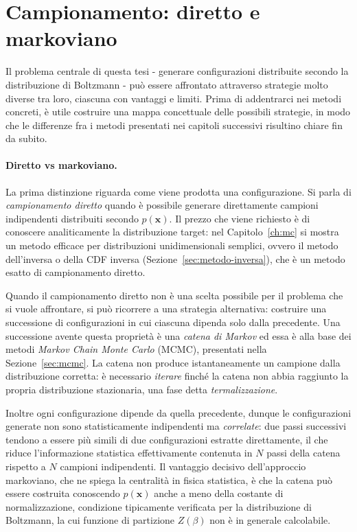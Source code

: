 \section{Campionamento: diretto e markoviano}
\label{sec:tassonomia_campionamento}

Il problema centrale di questa tesi - generare configurazioni distribuite secondo la distribuzione di Boltzmann - può essere affrontato attraverso strategie molto diverse tra loro, ciascuna con vantaggi e limiti. Prima di addentrarci nei metodi concreti, è utile costruire una mappa concettuale delle possibili strategie, in modo che le differenze fra i metodi presentati nei capitoli successivi risultino chiare fin da subito.
\paragraph*{Diretto vs markoviano.}
La prima distinzione riguarda come viene prodotta una configurazione. Si parla di \emph{campionamento diretto} quando è possibile generare direttamente campioni indipendenti distribuiti secondo $p(\mathbf{x})$. Il prezzo che viene richiesto è di conoscere analiticamente la distribuzione target: nel Capitolo~\ref{ch:mc} si mostra un metodo efficace per distribuzioni unidimensionali semplici, ovvero il metodo dell'inversa o della CDF inversa (Sezione~\ref{sec:metodo-inversa}), che è un metodo esatto di campionamento diretto.

Quando il campionamento diretto non è una scelta possibile per il problema che si vuole affrontare, si può ricorrere a una strategia alternativa: costruire una successione di configurazioni in cui ciascuna dipenda solo dalla precedente. Una successione avente questa proprietà è una \emph{catena di Markov} ed essa è alla base dei metodi \emph{Markov Chain Monte Carlo} (MCMC), presentati nella Sezione~\ref{sec:mcmc}. La catena non produce istantaneamente un campione dalla distribuzione corretta: è necessario \emph{iterare} finché la catena non abbia raggiunto la propria distribuzione stazionaria, una fase detta \emph{termalizzazione}. 

Inoltre ogni configurazione dipende da quella precedente, dunque le configurazioni generate non sono statisticamente indipendenti ma \emph{correlate}: due passi successivi tendono a essere più simili di due configurazioni estratte direttamente, il che riduce l'informazione statistica effettivamente contenuta in $N$ passi della catena rispetto a $N$ campioni indipendenti.
\newline
Il vantaggio decisivo dell'approccio markoviano, che ne spiega la centralità in fisica statistica, è che la catena può essere costruita conoscendo $p(\mathbf{x})$ anche a meno della costante di normalizzazione, condizione tipicamente verificata per la distribuzione di Boltzmann, la cui funzione di partizione $Z(\beta)$ non è in generale calcolabile.
